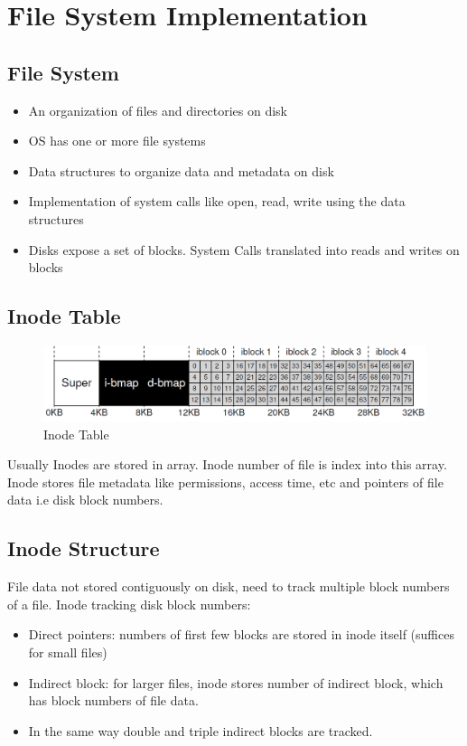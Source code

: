 \documentclass{article}
\begin{document}
\section{File System Implementation}
\subsection{File System}
\begin{itemize}
    \item An organization of files and directories on disk
    \item OS has one or more file systems
    \item Data structures to organize data and metadata on disk
    \item Implementation of system calls like open, read, write using the data structures
    \item Disks expose a set of blocks. System Calls translated into reads and writes on blocks
\end{itemize}
\pagebreak
\subsection{Inode Table}
    \begin{figure}[ht]
    \centering
    \includegraphics[scale = 0.3]{img/InodeTable.png}
    \caption{Inode Table}
    \end{figure}
Usually Inodes are stored in array. Inode number of file is index into this array. Inode stores file metadata like permissions, access time, etc and pointers of file data i.e disk block numbers.
\subsection{Inode Structure}
File data not stored contiguously on disk, need to track multiple block numbers of a file.
Inode tracking disk block numbers:
\begin{itemize}
    \item Direct pointers: numbers of first few blocks are stored in inode itself (suffices for small files)
    \item Indirect block: for larger files, inode stores number of indirect block, which has block numbers of file data.
    \item In the same way double and triple indirect blocks are tracked.
\end{itemize}
\end{document}
